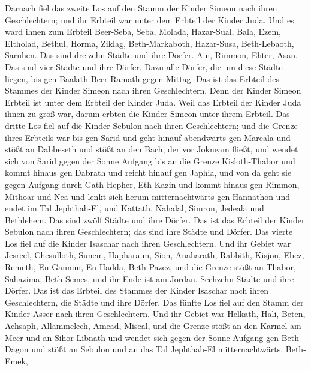  Darnach fiel das zweite Los auf den Stamm der Kinder Simeon
nach ihren Geschlechtern; und ihr Erbteil war unter dem Erbteil der
Kinder Juda.  Und es ward ihnen zum Erbteil Beer-Seba, Seba,
Molada,  Hazar-Sual, Bala, Ezem,  Eltholad,
Bethul, Horma,  Ziklag, Beth-Markaboth, Hazar-Susa,
 Beth-Lebaoth, Saruhen. Das sind dreizehn Städte und ihre
Dörfer.  Ain, Rimmon, Ehter, Asan. Das sind vier Städte und
ihre Dörfer.  Dazu alle Dörfer, die um diese Städte liegen,
bis gen Baalath-Beer-Ramath gegen Mittag. Das ist das Erbteil des
Stammes der Kinder Simeon nach ihren Geschlechtern.  Denn
der Kinder Simeon Erbteil ist unter dem Erbteil der Kinder Juda. Weil
das Erbteil der Kinder Juda ihnen zu groß war, darum erbten die Kinder
Simeon unter ihrem Erbteil.  Das dritte Los fiel auf die
Kinder Sebulon nach ihren Geschlechtern; und die Grenze ihres Erbteils
war bis gen Sarid  und geht hinauf abendwärts gen Mareala
und stößt an Dabbeseth und stößt an den Bach, der vor Jokneam fließt,
 und wendet sich von Sarid gegen der Sonne Aufgang bis an
die Grenze Kisloth-Thabor und kommt hinaus gen Dabrath und reicht hinauf
gen Japhia,  und von da geht sie gegen Aufgang durch
Gath-Hepher, Eth-Kazin und kommt hinaus gen Rimmon, Mithoar und Nea
 und lenkt sich herum mitternachtwärts gen Hannathon und
endet im Tal Jephthah-El,  und Kattath, Nahalal, Simron,
Jedeala und Bethlehem. Das sind zwölf Städte und ihre Dörfer.
 Das ist das Erbteil der Kinder Sebulon nach ihren
Geschlechtern; das sind ihre Städte und Dörfer.  Das vierte
Los fiel auf die Kinder Isaschar nach ihren Geschlechtern. 
Und ihr Gebiet war Jesreel, Chesulloth, Sunem,  Hapharaim,
Sion, Anaharath,  Rabbith, Kisjon, Ebez, 
Remeth, En-Gannim, En-Hadda, Beth-Pazez,  und die Grenze
stößt an Thabor, Sahazima, Beth-Semes, und ihr Ende ist am Jordan.
Sechzehn Städte und ihre Dörfer.  Das ist das Erbteil des
Stammes der Kinder Isaschar nach ihren Geschlechtern, die Städte und
ihre Dörfer.  Das fünfte Los fiel auf den Stamm der Kinder
Asser nach ihren Geschlechtern.  Und ihr Gebiet war
Helkath, Hali, Beten, Achsaph,  Allammelech, Amead, Miseal,
und die Grenze stößt an den Karmel am Meer und an Sihor-Libnath
 und wendet sich gegen der Sonne Aufgang gen Beth-Dagon und
stößt an Sebulon und an das Tal Jephthah-El mitternachtwärts, Beth-Emek,
